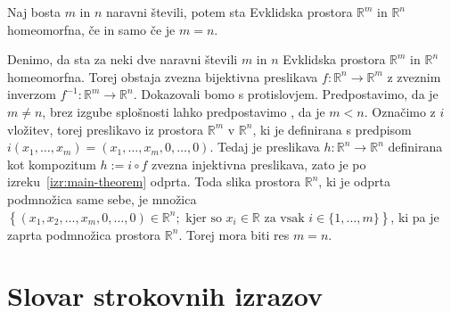 \documentclass[mat1]{fmfdelo}
\newcommand{\R}{\mathbb R}
\newcommand{\0}{\underline{0}}
\begin{document}
\begin{izrek}\label{izr:dim_izr}
Naj bosta $m$ in $n$ naravni števili, potem sta Evklidska prostora $\R^m$ in $\R^n$ homeomorfna, če in samo če je $m = n$.
\end{izrek}

\begin{dokaz}
Denimo, da sta za neki dve naravni števili $m$ in $n$ Evklidska prostora $\R^m$ in $\R^n$ homeomorfna. Torej obstaja zvezna bijektivna preslikava $f : \R^n \to \R^m$ z zveznim inverzom $f^{-1} : \R^m \to \R^n$. Dokazovali bomo s protislovjem. Predpostavimo, da je $m \neq n$, brez izgube splošnosti lahko predpostavimo , da je $m < n$. Označimo z $i$ vložitev, torej preslikavo iz prostora $\R^m$ v $\R^n$, ki je definirana s predpisom $i(x_1, \dots, x_m) = (x_1, \dots, x_m, 0, \dots, 0)$. Tedaj je preslikava $h : \R^n \to \R^n$ definirana kot kompozitum $h := i \circ f$ zvezna injektivna preslikava, zato je po izreku~\ref{izr:main-theorem} odprta. Toda slika prostora $\R^n$, ki je odprta podmnožica same sebe, je množica $\left \{ (x_1, x_2, \dots, x_m, 0, \dots, 0) \in \R^n ; \text{ kjer so } x_i \in \R \text{ za vsak } i \in \{1, \dots, m \}  \right \}$, ki pa je zaprta podmnožica prostora $\R^n$. Torej mora biti res $m = n$.
\end{dokaz}

\section*{Slovar strokovnih izrazov}

\geslo{}{}
\geslo{}{}
\end{document}

